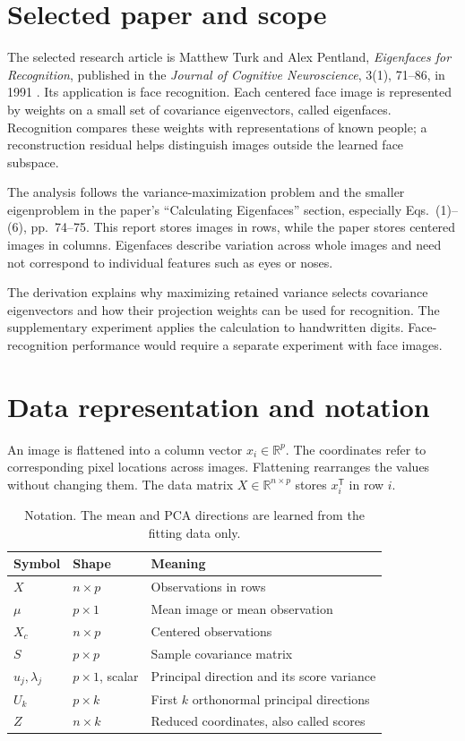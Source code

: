 \documentclass[11pt,a4paper,english]{article}
\numberwithin{equation}{section}
\newcommand{\R}{\mathbb{R}}
\newcommand{\T}{^{\mathsf T}}
\begin{document}
\section{Selected paper and scope}
The selected research article is Matthew Turk and Alex Pentland, \emph{Eigenfaces for Recognition}, published in the \emph{Journal of Cognitive Neuroscience}, 3(1), 71--86, in 1991 \cite{turk}. Its application is face recognition. Each centered face image is represented by weights on a small set of covariance eigenvectors, called eigenfaces. Recognition compares these weights with representations of known people; a reconstruction residual helps distinguish images outside the learned face subspace.

The analysis follows the variance-maximization problem and the smaller eigenproblem in the paper's ``Calculating Eigenfaces'' section, especially Eqs.~(1)--(6), pp.~74--75. This report stores images in rows, while the paper stores centered images in columns. Eigenfaces describe variation across whole images and need not correspond to individual features such as eyes or noses.

The derivation explains why maximizing retained variance selects covariance eigenvectors and how their projection weights can be used for recognition. The supplementary experiment applies the calculation to handwritten digits. Face-recognition performance would require a separate experiment with face images.

\section{Data representation and notation}
An image is flattened into a column vector $x_i\in\R^p$. The coordinates refer to corresponding pixel locations across images. Flattening rearranges the values without changing them. The data matrix $X\in\R^{n\times p}$ stores $x_i\T$ in row $i$.

\begin{table}[htbp]
\centering
\caption{Notation. The mean and PCA directions are learned from the fitting data only.}
\label{tab:notation}
\begin{tabularx}{\textwidth}{@{}l l X@{}}
\toprule Symbol & Shape & Meaning \\
\midrule
$X$ & $n\times p$ & Observations in rows \\
$\mu$ & $p\times1$ & Mean image or mean observation \\
$X_c$ & $n\times p$ & Centered observations \\
$S$ & $p\times p$ & Sample covariance matrix \\
$u_j,\lambda_j$ & $p\times1$, scalar & Principal direction and its score variance \\
$U_k$ & $p\times k$ & First $k$ orthonormal principal directions \\
$Z$ & $n\times k$ & Reduced coordinates, also called scores \\
\bottomrule
\end{tabularx}
\end{table}
\end{document}
